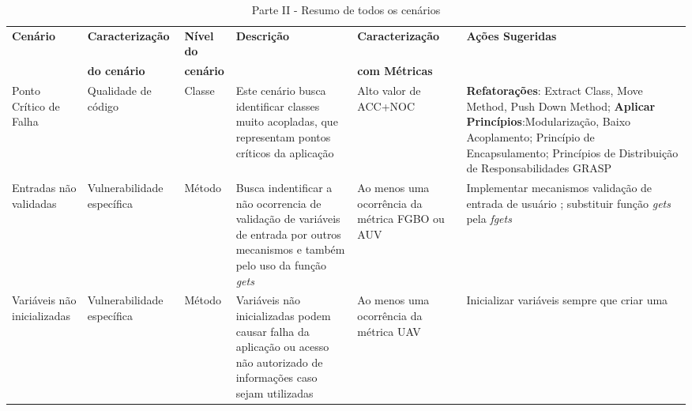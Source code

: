 \begin{landscape}
	\begin{table}[H]
		\begin{center}
	    \begin{tabular}{ |p{}| p{3cm} | p{2cm} | p{5cm} | p{5cm}  | p{5cm}  |}
	    \hline
	    \textbf{Cenário} & \textbf{Caracterização} & \textbf{Nível do} & \textbf{Descrição} & \textbf{Caracterização} & \textbf{Ações Sugeridas} \\
	      & \textbf{do cenário} & \textbf{cenário} &  & \textbf{com Métricas} & \\ 	\hline
	    
	    Ponto Crítico de Falha & Qualidade de código & Classe & Este cenário busca identificar classes muito acopladas, que representam pontos críticos da aplicação & Alto valor de ACC+NOC & \textbf{Refatorações}: Extract Class, Move Method, Push Down Method; \textbf{Aplicar Princípios}:Modularização, Baixo Acoplamento; Princípio de Encapsulamento; Princípios de Distribuição de Responsabilidades GRASP \\
	 \hline
	    Entradas não validadas  & Vulnerabilidade específica & Método & Busca indentificar a não ocorrencia de validação de variáveis de entrada por outros mecanismos e também pelo uso da função \emph{gets} & Ao menos uma ocorrência da métrica FGBO ou AUV & Implementar mecanismos validação de entrada de usuário ; substituir função \emph{gets} pela \emph{fgets} \\ \hline
	    Variáveis não inicializadas  & Vulnerabilidade específica & Método & Variáveis não inicializadas podem causar falha da aplicação ou acesso não autorizado de informações caso sejam utilizadas & Ao menos uma ocorrência da métrica UAV & Inicializar variáveis sempre que criar uma\\ \hline

	    \end{tabular}
		    \caption{Parte II - Resumo de todos os cenários}
		    \label{tab:resumo2}
		\end{center}
	\end{table}


\end{landscape}

